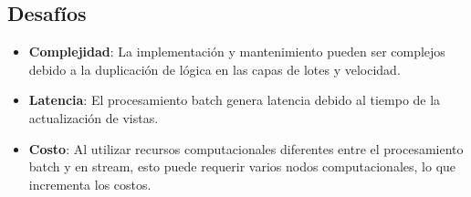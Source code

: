 \subsection{Desafíos}
\begin{itemize}
\item \textbf{Complejidad}: La implementación y mantenimiento pueden ser complejos debido a la duplicación de lógica en las capas de lotes y velocidad.
\item \textbf{Latencia}: El procesamiento batch genera latencia debido al tiempo de la actualización de vistas.
\item \textbf{Costo}: Al utilizar recursos computacionales diferentes entre el procesamiento batch y en stream, esto puede requerir varios nodos computacionales, lo que incrementa los costos.
\end{itemize}
\newpage